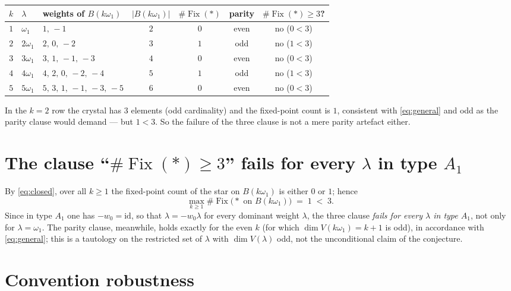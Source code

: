 \documentclass[11pt]{article}
\theoremstyle{definition}
\theoremstyle{remark}
\newcommand{\Fix}{\operatorname{Fix}}
\begin{document}
\begin{center}
\begin{tabular}{r l l c c c c}
\toprule
$k$ & $\lambda$ & weights of $B(k\omega_1)$ & $|B(k\omega_1)|$
    & $\#\Fix(*)$ & parity & $\#\Fix(*) \ge 3$? \\
\midrule
$1$ & $\omega_1$  & $1,\,-1$                & $2$ & $0$ & even & no ($0<3$) \\
$2$ & $2\omega_1$ & $2,\,0,\,-2$            & $3$ & $1$ & odd  & no ($1<3$) \\
$3$ & $3\omega_1$ & $3,\,1,\,-1,\,-3$       & $4$ & $0$ & even & no ($0<3$) \\
$4$ & $4\omega_1$ & $4,\,2,\,0,\,-2,\,-4$   & $5$ & $1$ & odd  & no ($1<3$) \\
$5$ & $5\omega_1$ & $5,\,3,\,1,\,-1,\,-3,\,-5$ & $6$ & $0$ & even & no ($0<3$) \\
\bottomrule
\end{tabular}
\end{center}

In the $k = 2$ row the crystal has $3$ elements (odd cardinality) and the
fixed-point count is $1$, consistent with \eqref{eq:general} and odd as the
parity clause would demand --- but $1 < 3$. So the failure of the three clause
is not a mere parity artefact either.

\section{The clause ``$\#\Fix(*) \ge 3$'' fails for every $\lambda$ in type $A_1$}

By \eqref{eq:closed}, over all $k \ge 1$ the fixed-point count of the star on
$B(k\omega_1)$ is either $0$ or $1$; hence
\[
\max_{k \ge 1} \#\Fix\bigl(* \text{ on } B(k\omega_1)\bigr) \;=\; 1 \;<\; 3 .
\]
Since in type $A_1$ one has $-w_0 = \mathrm{id}$, so that
$\lambda = -w_0\lambda$ for every dominant weight $\lambda$, the three clause
\emph{fails for every $\lambda$ in type $A_1$}, not only for $\lambda =
\omega_1$. The parity clause, meanwhile, holds exactly for the even $k$ (for
which $\dim V(k\omega_1) = k+1$ is odd), in accordance with \eqref{eq:general};
this is a tautology on the restricted set of $\lambda$ with $\dim V(\lambda)$
odd, not the unconditional claim of the conjecture.

\section{Convention robustness}
\end{document}
